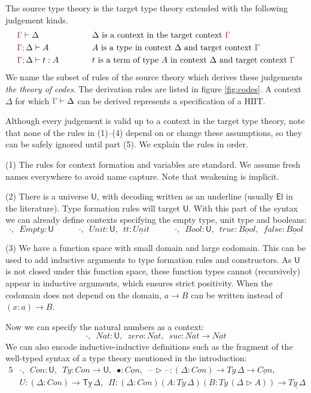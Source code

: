 \documentclass[a4paper,UKenglish]{lipics-v2018}
\newcommand{\U}{\mathsf{U}}
\newcommand{\El}{\mathsf{El}}
\newcommand{\ra}{\rightarrow}
\newcommand{\Ty}{\mathsf{Ty}}
\newcommand{\blank}{\mathord{\hspace{1pt}\text{--}\hspace{1pt}}} %
\newcommand{\1}{\mathsf{1}} \renewcommand{\Pr}{\mathsf{Pr}}
\renewcommand{\hat}[1]{{\color{BrickRed}{#1}}}
\newcommand{\semicol}{\hat;\,}
\begin{document}
The source type theory is the target type theory extended with the
following judgement kinds.
\begin{alignat*}{4}
  & \hat{\Gamma}\vdash\Delta && \text{$\Delta$ is a context in the target context $\hat{\Gamma}$}\\
  & \hat{\Gamma}\semicol\Delta\vdash A && \text{$A$ is a type in context $\Delta$ and target context $\hat{\Gamma}$} \\
  & \hat{\Gamma}\semicol\Delta\vdash t : A \hspace{3em} && \text{$t$ is a term of type $A$ in context $\Delta$ and target context $\hat{\Gamma}$}
\end{alignat*}
We name the subset of rules of the source theory which derives these
judgements \emph{the theory of codes}. The derivation rules are listed
in figure \ref{fig:codes}. A context $\Delta$ for which
$\hat{\Gamma}\vdash\Delta$ can be derived represents a specification of a
HIIT.

Although every judgement is valid up to a context in the target
type theory, note that none of the rules in (1)--(4) depend on or
change these assumptions, so they can be safely ignored until part
(5). We explain the rules in order.

(1) The rules for context formation and variables are standard. We
assume fresh names everywhere to avoid name capture. Note that
weakening is implicit.

(2) There is a universe $\U$, with decoding written as an underline
(usually $\El$ in the literature). Type formation rules will target
$\U$. With this part of the syntax we can already define contexts
specifying the empty type, unit type and booleans:
\[
\cdot,\,\,\,Empty:\U \hspace{3em} \cdot,\,\,\,Unit:\U,\,\,\,tt:\underline{Unit} \hspace{3em} \cdot,\,\,\,Bool:\U,\,\,\,true:\underline{Bool},\,\,\,false:\underline{Bool}
\]

(3) We have a function space with small domain and large
codomain. This can be used to add inductive arguments to type
formation rules and constructors. As $\U$ is not closed under this
function space, these function types cannot (recursively) appear in
inductive arguments, which ensures strict positivity. When the
codomain does not depend on the domain, $a\ra B$ can be written
instead of $(x:a)\ra B$.

Now we can specify the natural numbers as a context:
\[
\cdot,\,\,\,Nat : \U,\,\,\,zero:\underline{Nat},\,\,\,suc:Nat\ra\underline{Nat}
\]
We can also encode inductive-inductive definitions such as the
fragment of the well-typed syntax of a type theory mentioned in the
introduction:
\begin{alignat*}{5}
  & \cdot,\,\,\,Con:\U,\,\,\,Ty:Con\ra\U,\,\,\,\bullet:\underline{Con},\,\,\,\blank\rhd\blank:(\Delta:Con)\ra Ty\,\Delta\ra\underline{Con}, \\
  & U : (\Delta:Con)\ra \underline{\Ty\,\Delta},\,\,\,\Pi:(\Delta:Con)(A:Ty\,\Delta)(B:Ty\,(\Delta\rhd A))\ra\underline{Ty\,\Delta}
\end{alignat*}
\end{document}
